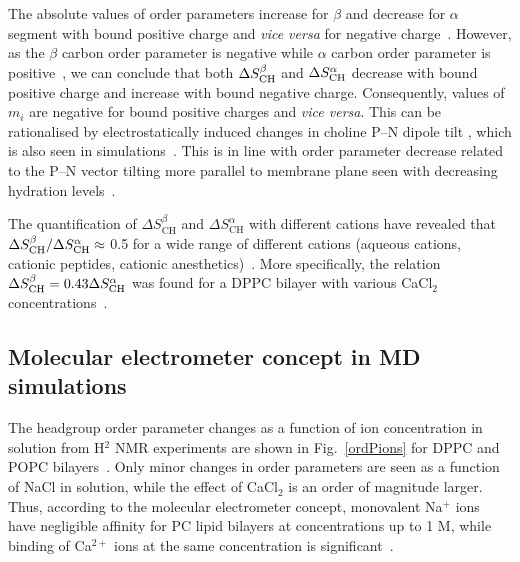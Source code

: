 \documentclass[twoside,twocolumn,9pt]{article}
\begin{document}
The absolute values of order parameters 
increase for $\beta$ and decrease for $\alpha$ segment with bound positive charge
and {\it vice versa} for negative charge~\cite{brown77,akutsu81,altenbach84,altenbach85,seelig87,scherer89,rydall92}. 
However, as the $\beta$ carbon order parameter is negative while $\alpha$ carbon order parameter is 
positive~\cite{hong95a,hong95b,gross97}, we can conclude 
that both $\Delta S_{\rm{CH}}^{\beta}$ and $\Delta S_{\rm{CH}}^{\alpha}$ decrease with bound positive charge 
and increase with bound negative charge. Consequently, values of $m_i$ are negative for
bound positive charges and {\it vice versa}. This can be rationalised by electrostatically 
induced changes in choline P--N dipole tilt \cite{seelig87,scherer89,seelig90}, which is also
seen in simulations~\cite{gurtovenko05,cordomi08,cordomi09,zhao12}. 
This is in line with order parameter decrease related to the P--N vector tilting more parallel to membrane plane seen with decreasing hydration levels~\cite{botan15}. 


The quantification of $\Delta S_\mathrm{CH}^\beta$ and $\Delta S_\mathrm{CH}^\alpha$
with different cations
have revealed that $\Delta S_{\rm{CH}}^{\beta}/\Delta S_{\rm{CH}}^{\alpha} \approx$ 0.5 for a wide range
of different cations (aqueous cations, cationic peptides, cationic anesthetics)~\cite{beschiasvili91,rydall92}.
More specifically,
the relation $\Delta S_{\rm{CH}}^{\beta}=0.43 \Delta S_{\rm{CH}}^{\alpha}$ was found for a DPPC bilayer
with various CaCl$_2$ concentrations~\cite{akutsu81}.


\subsection{Molecular electrometer concept in MD simulations}\label{electrometerinsimulations}

The headgroup order parameter changes as a function of ion concentration in
solution from H$^2$ NMR experiments are shown in Fig.~\ref{ordPions} for DPPC and POPC bilayers~\cite{akutsu81,altenbach84}.
Only minor changes in order parameters are seen
as a function of NaCl in solution, 
while the effect of CaCl$_2$ is an order of magnitude larger. 
Thus, according to the molecular electrometer concept, 
monovalent Na$^+$ ions have negligible affinity for PC lipid bilayers at concentrations up to 1 M,
while binding of Ca$^{2+}$ ions at the same concentration is significant~\cite{akutsu81,altenbach84}. 
\end{document}
